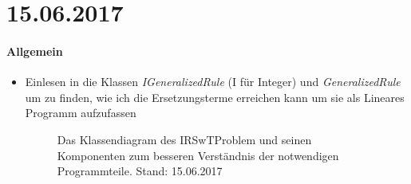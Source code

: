 \section*{15.06.2017}



\paragraph{Allgemein}
\begin{itemize}
	\item Einlesen in die Klassen \emph{IGeneralizedRule} (I für Integer) und \emph{GeneralizedRule} um zu 	finden, wie ich die Ersetzungsterme erreichen kann um sie als Lineares Programm aufzufassen
		\begin{figure}[h]
			\centering
			
			\caption{Das Klassendiagram des IRSwTProblem und seinen Komponenten zum besseren Verständnis der notwendigen Programmteile. Stand: 15.06.2017}
			\label{15.06.2017:: IRSwTProblem-classdiagram}
		\end{figure}
\end{itemize}
